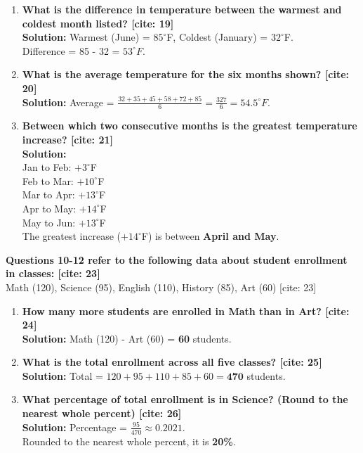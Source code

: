 \documentclass[11pt]{article}
\begin{document}
\begin{enumerate}[resume]
    \item \textbf{What is the difference in temperature between the warmest and coldest month listed? [cite: 19]} \\
    \textbf{Solution:} Warmest (June) = $85^\circ$F, Coldest (January) = $32^\circ$F. \\
    Difference = 85 - 32 = \textbf{$53^\circ F$}.
    
    \item \textbf{What is the average temperature for the six months shown? [cite: 20]} \\
    \textbf{Solution:} Average = $\frac{32 + 35 + 45 + 58 + 72 + 85}{6} = \frac{327}{6} = 54.5^\circ F$.
    
    \item \textbf{Between which two consecutive months is the greatest temperature increase? [cite: 21]} \\
    \textbf{Solution:} \\
    Jan to Feb: $+3^\circ$F \\
    Feb to Mar: $+10^\circ$F \\
    Mar to Apr: $+13^\circ$F \\
    Apr to May: $+14^\circ$F \\
    May to Jun: $+13^\circ$F \\
    The greatest increase ($+14^\circ$F) is between \textbf{April and May}.
\end{enumerate}

\vspace{0.5cm}
\noindent \textbf{Questions 10-12 refer to the following data about student enrollment in classes: [cite: 23]} \\
Math (120), Science (95), English (110), History (85), Art (60) [cite: 23]

\begin{enumerate}[resume]
    \item \textbf{How many more students are enrolled in Math than in Art? [cite: 24]} \\
    \textbf{Solution:} Math (120) - Art (60) = \textbf{60} students.
    
    \item \textbf{What is the total enrollment across all five classes? [cite: 25]} \\
    \textbf{Solution:} Total = $120 + 95 + 110 + 85 + 60 = \textbf{470}$ students.
    
    \item \textbf{What percentage of total enrollment is in Science? (Round to the nearest whole percent) [cite: 26]} \\
    \textbf{Solution:} Percentage = $\frac{95}{470} \approx 0.2021$. \\
    Rounded to the nearest whole percent, it is \textbf{20\%}.
\end{enumerate}
\end{document}
